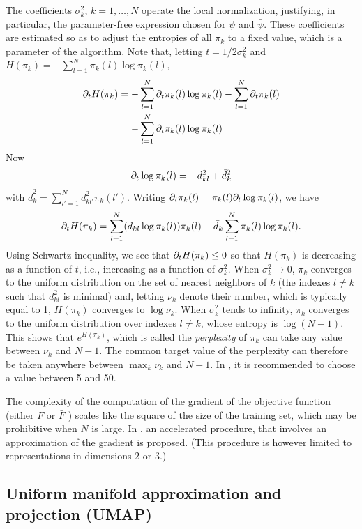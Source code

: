The coefficients $\sigma^2_k$, $k=1, \ldots, N$ operate the local normalization, justifying, in particular, the parameter-free expression chosen for $\psi$ and $\bar\psi$. These coefficients are estimated
so as to adjust the entropies of all $\pi_k$ to a fixed value, which is a parameter of the algorithm. Note that, letting $t = 1/2\sigma_k^2$
and $H(\pi_k) = -\sum_{l=1}^N \pi_k(l) \log\pi_k(l)$, 
\begin{align*}
\partial_t H(\pi_k) &= - \sum_{l=1}^N \partial_t \pi_k(l) \log\pi_k(l) - \sum_{l=1}^N \partial_t \pi_k(l) \\
&= - \sum_{l=1}^N \partial_t \pi_k(l) \log\pi_k(l)
\end{align*}
Now
\[
\partial_t \log \pi_k(l) = - d_{kl}^2 + \bar d^2_k 
\]
with $\bar d_k^2 = \sum_{l'=1}^N d_{kl'}^2 \pi_k(l')$.
Writing $\partial_t \pi_k(l) = \pi_k(l) \partial_t\log\pi_k(l)$, we have
\[
\partial_t H(\pi_k) = \sum_{l=1}^N (d_{kl} \log\pi_k(l)) \pi_k(l)  - \bar d_k \sum_{l=1}^N \pi_k(l) \log\pi_k(l).
\]
Using Schwartz inequality, we see that $\partial_t H(\pi_k) \leq 0$ so that $H(\pi_k)$ is decreasing as a function of $t$, i.e., increasing as a function of $\sigma^2_k$. When $\sigma_k^2\to 0$, $\pi_k$ converges to the uniform distribution on the set of nearest neighbors of $k$ (the indexes $l\neq k$ such that $d_{kl}^2$ is minimal) and, letting $\nu_k$ denote their number, which is typically equal to 1, $H(\pi_k)$ converges to $\log\nu_k$. When $\sigma^2_k$ tends to infinity, $\pi_k$ converges to the uniform distribution over indexes $l\neq k$, whose entropy is $\log (N-1)$. This shows that $e^{H(\pi_k)}$, which is called the {\em perplexity} of $\pi_k$ can take any value between $\nu_k$ and $N-1$. The common target value of the perplexity can therefore be taken anywhere between $\max_k\nu_k$ and $N-1$. In \citet{maaten2008visualizing}, it is recommended to choose a value between 5 and 50.

\begin{remark}
The complexity of the computation of the gradient of the objective function (either $F$ or $\bar F$ ) scales like the square of the size of the training set, which may be prohibitive when $N$ is large. In \citet{van2014accelerating}, an accelerated procedure, that involves an approximation of the gradient is proposed. (This procedure is however limited to representations in dimensions 2 or 3.)
\end{remark}

\subsection{Uniform manifold approximation and projection (UMAP)}

